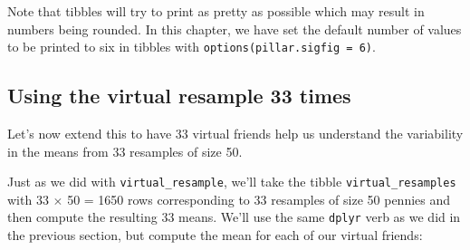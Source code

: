 \documentclass[12pt, krantz2,]{krantz}
\makeatletter
\newenvironment{Shaded}{\begin{snugshade}}{\end{snugshade}}
\newcommand{\DataTypeTok}[1]{\textcolor[rgb]{0.27,0.27,0.27}{#1}}
\newcommand{\DecValTok}[1]{\textcolor[rgb]{0.06,0.06,0.06}{#1}}
\newcommand{\KeywordTok}[1]{\textcolor[rgb]{0.27,0.27,0.27}{\textbf{#1}}}
\newcommand{\NormalTok}[1]{#1}
\newcommand{\OperatorTok}[1]{\textcolor[rgb]{0.43,0.43,0.43}{\textbf{#1}}}
\newcommand{\OtherTok}[1]{\textcolor[rgb]{0.37,0.37,0.37}{#1}}
\newcommand{\StringTok}[1]{\textcolor[rgb]{0.5,0.5,0.5}{#1}}
\newenvironment{kframe}{%
\medskip{}
\setlength{\fboxsep}{.8em}
 \def\at@end@of@kframe{}%
 \ifinner\ifhmode%
  \def\at@end@of@kframe{\end{minipage}}%
  \begin{minipage}{\columnwidth}%
 \fi\fi%
 \def\FrameCommand##1{\hskip\@totalleftmargin \hskip-\fboxsep
 \colorbox{shadecolor}{##1}\hskip-\fboxsep
     \hskip-\linewidth \hskip-\@totalleftmargin \hskip\columnwidth}%
 \MakeFramed {\advance\hsize-\width
   \@totalleftmargin\z@ \linewidth\hsize
   \@setminipage}}%
 {\par\unskip\endMakeFramed%
 \at@end@of@kframe}
\renewenvironment{Shaded}{\begin{kframe}}{\end{kframe}}
\makeatother
\begin{document}
Note that tibbles will try to print as pretty as possible which may result in numbers being rounded. In this chapter, we have set the default number of values to be printed to six in tibbles with \texttt{options(pillar.sigfig\ =\ 6)}.

\hypertarget{using-the-virtual-resample-33-times}{%
\subsection{Using the virtual resample 33 times}\label{using-the-virtual-resample-33-times}}

Let's now extend this to have 33 virtual friends help us understand the variability in the means from 33 resamples of size 50.

\begin{Shaded}
\end{Shaded}

Just as we did with \texttt{virtual\_resample}, we'll take the tibble \texttt{virtual\_resamples} with 33 \(\times\) 50 = 1650 rows corresponding to 33 resamples of size 50 pennies and then compute the resulting 33 means. We'll use the same \texttt{dplyr} verb as we did in the previous section, but compute the mean for each of our virtual friends:

\begin{Shaded}
\end{Shaded}

\begingroup\fontsize{10}{12}\selectfont
\end{document}
